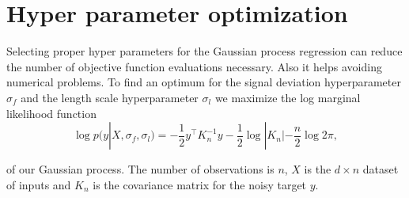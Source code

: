 \section{Hyper parameter optimization}
Selecting proper hyper parameters for the Gaussian process regression can reduce the number of objective function evaluations necessary. Also it helps avoiding numerical problems. To find an optimum for the signal deviation hyperparameter $\sigma_f$ and the length scale hyperparameter $\sigma_l$ we maximize the log marginal likelihood function
\begin{equation} \label{eq:hypOpt}
    \log p(y|X,\sigma_f,\sigma_l) = -\frac{1}{2} y^\top K_n^{-1} y -\frac{1}{2} \log |K_n| -\frac{n}{2}\log 2\pi ,
\end{equation}

of our Gaussian process. The number of observations is $n$, $X$ is the $d \times n$ dataset of inputs and $K_n$ is the covariance matrix for the noisy target $y$.
